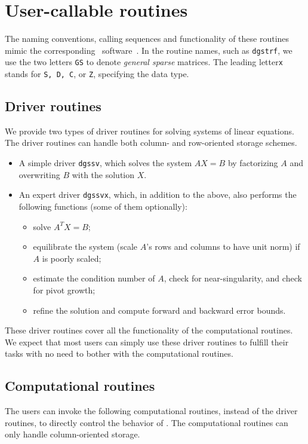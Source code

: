 \section{User-callable routines}
\label{sec:routine}

The naming conventions, calling sequences and functionality of
these routines mimic the corresponding \LAPACK\ software~\cite{lapackmanual2}.
In the routine names, such as {\tt dgstrf}, we use the two letters
{\tt GS} to denote {\em general sparse} matrices. The leading
letter{\tt x} stands for {\tt S, D, C}, or {\tt Z}, specifying the data type.


\subsection{Driver routines}
We provide two types of driver routines for solving systems of 
linear equations. The driver routines can handle both column-
and row-oriented storage schemes.
\begin{itemize}
\item A simple driver {\tt dgssv}, which solves the system $AX=B$ by 
      factorizing $A$ and overwriting $B$ with the solution $X$. 
\item An expert driver {\tt dgssvx}, which, in addition to the above, also 
      performs the following functions (some of them optionally):
      \begin{itemize}
      \item solve $A^TX=B$;
      \item equilibrate the system (scale $A$'s rows and columns to have
		unit norm) if $A$ is poorly scaled;
      \item estimate the condition number of $A$, check for near-singularity,
            and check for pivot growth;
      \item refine the solution and compute forward and backward error bounds.
      \end{itemize}
\end{itemize}

These driver routines cover all the functionality of the computational
routines. We expect that most users can simply use these driver routines
to fulfill their tasks with no need to bother with the computational routines.


\subsection{Computational routines}
The users can invoke the following computational routines, instead of the
driver routines, to directly control the behavior of {\SuperLU}.
The computational routines can only handle column-oriented storage.

